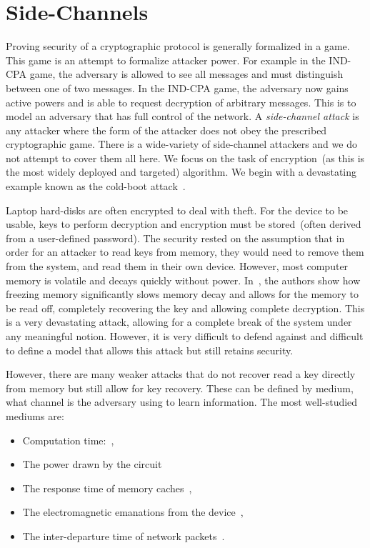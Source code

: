 \documentclass{article}
\begin{document}
\section{Side-Channels}\label{sec:side channels}
Proving security of a cryptographic protocol is generally formalized in a game.  This game is an attempt to formalize attacker power.  For example in the IND-CPA game, the adversary is allowed to see all messages and must distinguish between one of two messages.  In the IND-CPA game, the adversary now gains active powers and is able to request decryption of arbitrary messages.  This is to model an adversary that has full control of the network.  A \emph{side-channel attack} is any attacker where the form of the attacker does not obey the prescribed cryptographic game.  There is a wide-variety of side-channel attackers and we do not attempt to cover them all here.  We focus on the task of encryption~(as this is the most widely deployed and targeted) algorithm.  We begin with a devastating example known as the cold-boot attack~\cite{coldboot}.

Laptop hard-disks are often encrypted to deal with theft.  For the device to be usable, keys to perform decryption and encryption must be stored~(often derived from a user-defined password).  The security rested on the assumption that in order for an attacker to read keys from memory, they would need to remove them from the system, and read them in their own device.  However, most computer memory is volatile and decays quickly without power.  In~\cite{coldboot}, the authors show how freezing memory significantly slows memory decay and allows for the memory to be read off, completely recovering the key and allowing complete decryption.  This is a very devastating attack, allowing for a complete break of the system under any meaningful notion.  However, it is very difficult to defend against and difficult to define a model that allows this attack but still retains security.

However, there are many weaker attacks that do not recover read a key directly from memory but still allow for key recovery.  These can be defined by medium, what channel is the adversary using to learn information.  The most well-studied mediums are:
\begin{itemize}
\item Computation time:~\cite{kocherTiming}, 
\item The power drawn by the circuit~\cite{kocherDPA}
\item The response time of memory caches~\cite{Bernstein05cache-timingattacks, Tromer:2010fk}, 
\item The electromagnetic emanations from the device~\cite{DEMAConcrete,DEMASmartCards},
\item The inter-departure  time of network packets~\cite{voipAnalysis}.
\end{itemize}
\end{document}
